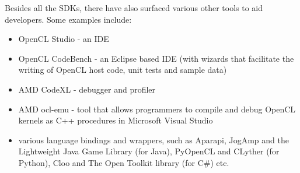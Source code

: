 Besides all the SDKs, there have also surfaced various other tools to aid developers. Some examples include: 
\begin{itemize}
\item OpenCL Studio - an IDE \cite{http://www.opencldev.com/}
\item OpenCL CodeBench - an Eclipse based IDE (with wizards that facilitate the writing of OpenCL host code, unit tests and sample data) \cite{http://www.amdahlsoftware.com/multi-core-products/overview/}
\item AMD CodeXL - debugger and profiler \cite {http://developer.amd.com/tools/hc/CodeXL/}
\item AMD ocl-emu - tool that allows programmers to compile and debug OpenCL kernels as C++ procedures in Microsoft Visual Studio \cite{http://developer.amd.com/tools-and-sdks/open-source/opencl-emulator-debugger/}
\item various language bindings and wrappers, such as Aparapi\cite{http://code.google.com/p/aparapi}, JogAmp\cite{http://jogamp.org/} and the Lightweight Java Game Library\cite{http://www.lwjgl.org/} (for Java), PyOpenCL\cite{http://mathema.tician.de/software/pyopencl/} and CLyther\cite{http://srossross.github.io/Clyther/} (for Python), Cloo\cite{http://sourceforge.net/projects/cloo/} and The Open Toolkit library\cite{http://sourceforge.net/projects/opentk/} (for C\#) etc.
\end{itemize}

